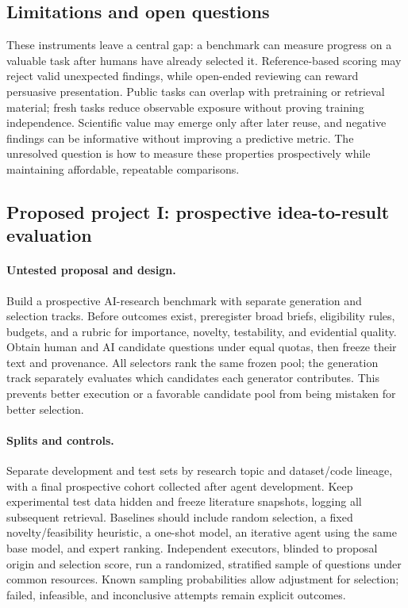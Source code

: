 \subsection{Limitations and open questions}

These instruments leave a central gap: a benchmark can measure progress on a valuable task after humans have already selected it. Reference-based scoring may reject valid unexpected findings, while open-ended reviewing can reward persuasive presentation. Public tasks can overlap with pretraining or retrieval material; fresh tasks reduce observable exposure without proving training independence. Scientific value may emerge only after later reuse, and negative findings can be informative without improving a predictive metric. The unresolved question is how to measure these properties prospectively while maintaining affordable, repeatable comparisons.

\subsection{Proposed project I: prospective idea-to-result evaluation}

\paragraph{Untested proposal and design.}
Build a prospective AI-research benchmark with separate generation and selection tracks. Before outcomes exist, preregister broad briefs, eligibility rules, budgets, and a rubric for importance, novelty, testability, and evidential quality. Obtain human and AI candidate questions under equal quotas, then freeze their text and provenance. All selectors rank the same frozen pool; the generation track separately evaluates which candidates each generator contributes. This prevents better execution or a favorable candidate pool from being mistaken for better selection.

\paragraph{Splits and controls.}
Separate development and test sets by research topic and dataset/code lineage, with a final prospective cohort collected after agent development. Keep experimental test data hidden and freeze literature snapshots, logging all subsequent retrieval. Baselines should include random selection, a fixed novelty/feasibility heuristic, a one-shot model, an iterative agent using the same base model, and expert ranking. Independent executors, blinded to proposal origin and selection score, run a randomized, stratified sample of questions under common resources. Known sampling probabilities allow adjustment for selection; failed, infeasible, and inconclusive attempts remain explicit outcomes.

